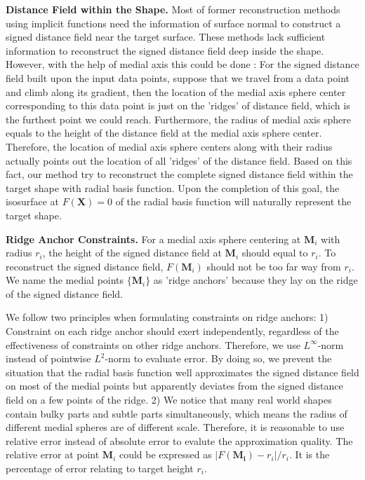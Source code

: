 \documentclass[annual]{acmsiggraph}
\begin{document}
\textbf{Distance Field within the Shape. }
Most of former reconstruction methods using implicit functions need the information of surface normal to construct a signed distance field near the target surface. These methods lack sufficient information to reconstruct the signed distance field deep inside the shape. However, with the help of medial axis this could be done : For the signed distance field built upon the input data points, suppose that we travel from a data point and climb along its gradient, then the location of the medial axis sphere center corresponding to this data point is just on the 'ridges' of distance field, which is the furthest point we could reach. Furthermore, the radius of medial axis sphere equals to the height of the distance field at the medial axis sphere center. Therefore, the location of medial axis sphere centers along with their radius actually points out the location of all 'ridges' of the distance field. Based on this fact, our method try to reconstruct the complete signed distance field within the target shape with radial basis function. Upon the completion of this goal, the isosurface at $F(\mathbf{X})=0$ of the radial basis function will naturally represent the target shape.

\textbf{Ridge Anchor Constraints. }
For a medial axis sphere centering at $\mathbf{M}_i$ with radius $r_i$, the height of the signed distance field at $\mathbf{M}_i$ should equal to $r_i$. To reconstruct the signed distance field, $F(\mathbf{M}_i)$ should not be too far way from $r_i$. We name the medial points $\{\mathbf{M}_i\}$ as 'ridge anchors' because they lay on the ridge of the signed distance field. 

We follow two principles when formulating constraints on ridge anchors: 1) Constraint on each ridge anchor should exert independently, regardless of the effectiveness of constraints on other ridge anchors. Therefore, we use $L^{\infty}$-norm instead of pointwise $L^2$-norm to evaluate error. By doing so, we prevent the situation that the radial basis function well approximates the signed distance field on most of the medial points but apparently deviates from the signed distance field on a few points of the ridge. 2) We notice that many real world shapes contain bulky parts and subtle parts simultaneously, which means the radius of different medial spheres are of different scale. Therefore, it is reasonable to use relative error instead of absolute error to evalute the approximation quality. The relative error at point $\mathbf{M}_i$ could be expressed as $|F(\mathbf{M_i})-r_i|/r_i$. It is the percentage of error relating to target height $r_i$.
\end{document}
